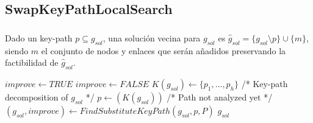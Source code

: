 \subsection{SwapKeyPathLocalSearch}
\begin{frame}\frametitle{}
\begin{definition}
Dado un key-path $p \subseteq g_{sol}$, una solución vecina para $g_{sol}$ es 
$\hat{g}_{sol} = \{ g_{sol}\setminus p \}\cup \{m\}$, 
siendo $m$ el conjunto de nodos y enlaces que serán añadidos preservando la factibilidad de ${\hat{g}}_{sol}$.  
\end{definition}
\begin{block}{}
\begin{algorithm}[H]
\caption{$g_{sol} = SwapKeyPathLocalSearch(G_B,C,g_{sol},P)$}
\begin{algorithmic}[1]
\begin{scriptsize}
\STATE $improve \leftarrow TRUE$
\STATE $improve \leftarrow FALSE$
\STATE $K(g_{sol}) \leftarrow \{p_1,\ldots,p_h\}$ /* Key-path decomposition of $g_{sol}$ */
\STATE $p \leftarrow(K(g_{sol}))$ /* Path not analyzed yet */
\STATE $(g_{sol},improve) \leftarrow FindSubstituteKeyPath(g_{sol},p,P)$
\ENDWHILE
\ENDWHILE
\RETURN $g_{sol}$
\end{scriptsize}
\end{algorithmic}
\end{algorithm}
\end{block}
\end{frame}

